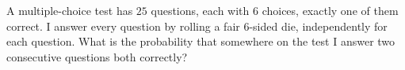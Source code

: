 A multiple-choice test has $25$ questions, each with $6$ choices, exactly one of them correct. I answer every question by rolling a fair $6$-sided die, independently for each question. What is the probability that somewhere on the test I answer two consecutive questions both correctly?
